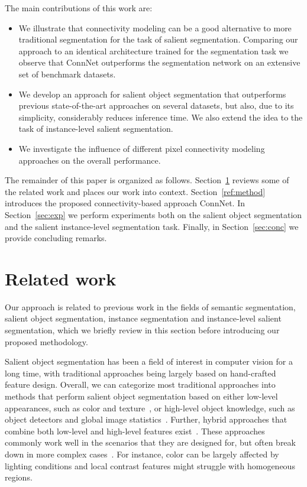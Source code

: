 \documentclass[journal]{IEEEtran}
\begin{document}
The main contributions of this work are:
\begin{itemize}
    \item We illustrate that connectivity modeling can be a good alternative to more traditional segmentation for the task of salient segmentation. Comparing our approach to an identical architecture trained for the segmentation task we observe that ConnNet outperforms the segmentation network on an extensive set of benchmark datasets.
    \item We develop an approach for salient object segmentation that outperforms previous state-of-the-art approaches on several datasets, but also, due to its simplicity, considerably reduces inference time. We also extend the idea to the task of instance-level salient segmentation.
    \item We investigate the influence of different pixel connectivity modeling approaches on the overall performance.
\end{itemize}

The remainder of this paper is organized as follows. Section~\ref{sec:relWork} reviews some of the related work and places our work into context. Section~\ref{ref:method} introduces the proposed connectivity-based approach ConnNet. In Section~\ref{sec:exp} we perform experiments both on the salient object segmentation and the salient instance-level segmentation task. Finally, in Section~\ref{sec:conc} we provide concluding remarks.

\section{Related work}
\label{sec:relWork}
Our approach is related to previous work in the fields of semantic segmentation, salient object segmentation, instance segmentation and instance-level salient segmentation, which we briefly review in this section before introducing our proposed methodology.

Salient object segmentation has been a field of interest in computer vision for a long time, with traditional approaches being largely based on hand-crafted feature design. Overall, we can categorize most traditional approaches into methods that perform salient object segmentation based on either low-level appearances, such as color and texture~\cite{valenti2009image, liu2011learning,perazzi2012saliency}, or high-level object knowledge, such as object detectors and global image statistics~\cite{cheng2015global,shen2012unified,goferman2012context}. Further, hybrid approaches that combine both low-level and high-level features exist~\cite{jia2013category, chang2011fusing}. 
These approaches commonly work well in the scenarios that they are designed for, but often break down in more complex cases~\cite{li2016deep, li2014secrets}. For instance, color can be largely affected by lighting conditions and local contrast features might struggle with homogeneous regions.
\end{document}
